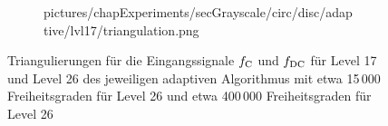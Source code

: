 \begin{figure}[p]
\begin{subfigure}[b]{.48\linewidth}
      {pictures/chapExperiments/secGrayscale/circ/disc/adaptive/lvl17/triangulation.png}
    \label{fig:circDiscLvl17Triang}
  \end{subfigure}
%
  \caption{Triangulierungen für die Eingangssignale $f_\textup{C}$ und
  $f_\textup{DC}$ für Level 17 und Level 26 des jeweiligen adaptiven
  Algorithmus mit etwa 15\,000 Freiheitsgraden für Level 26 und etwa 400\,000
  Freiheitsgraden für Level 26}
  \label{fig:circleTriang}
\end{figure}
